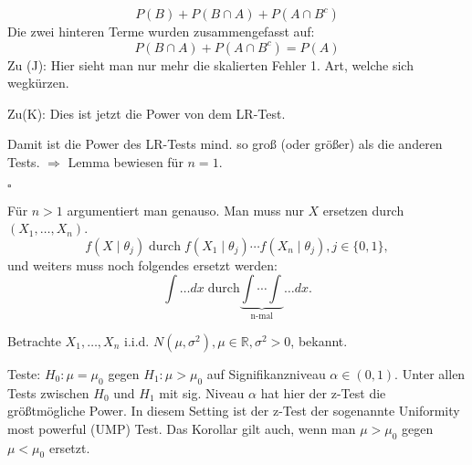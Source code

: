 \documentclass[10pt]{article}
\newcommand{\FZV}{X_1, \ldots, X_n} %
\newcommand{\IR}{\mathbb{R}} %
\newenvironment{BWS}[1][]
{\begin{Beweis}[frametitle=#1]}{\end{Beweis}}
\begin{document}
\begin{BWS}[Beweis 2.1.1 (NP-Lemma)]
			\begin{equation*}
				P(B) + P(B \cap A) + P(A \cap B^c)
			\end{equation*}
			Die zwei hinteren Terme wurden zusammengefasst auf:
			\begin{equation*}
				P(B \cap A) + P(A \cap B^c) = P(A)
			\end{equation*}
			Zu (J): Hier sieht man nur mehr die skalierten Fehler 1. Art, welche sich wegkürzen.
			
			Zu(K): Dies ist jetzt die Power von dem LR-Test. 
			
			
			Damit ist die Power des LR-Tests mind. so groß (oder größer) als die anderen Tests. $\Rightarrow$ Lemma bewiesen für $n = 1$. 
			
			\begin{flushright}
				$\square$
			\end{flushright}
			Für $n > 1$ argumentiert man genauso. Man muss nur $X$ ersetzen durch $(\FZV)$.
			\begin{equation*}
				f(X \mid \theta_j) \; \text{durch} \; f(X_1 \mid \theta_j)\cdots f(X_n \mid \theta_j), j \in \{0,1\},
			\end{equation*}
			und weiters muss noch folgendes ersetzt werden:
			\begin{equation*}
				\int \ldots dx \; \text{durch} \underbrace{\int \cdots \int}_{\text{n-mal}} \ldots dx. 
			\end{equation*}
			\end{BWS}
			\begin{Korollar}
			Betrachte $\FZV$ i.i.d. $N(\mu, \sigma^2), \mu \in \IR, \sigma^2 > 0$, bekannt. 
			
			Teste: $H_0: \mu = \mu_0$ gegen $H_1: \mu > \mu_0$ auf Signifikanzniveau $\alpha \in (0,1)$. Unter allen Tests zwischen $H_0$ und $H_1$ mit sig. Niveau $\alpha$ hat hier der z-Test die größtmögliche Power. In diesem Setting ist der z-Test der sogenannte Uniformity most powerful (UMP) Test. Das Korollar gilt auch, wenn man $\mu > \mu_0$ gegen $\mu < \mu_0$ ersetzt.
			\end{Korollar}
\end{document}
